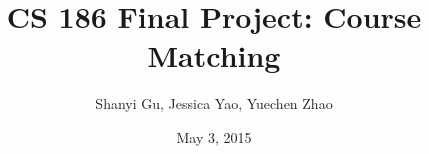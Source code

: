 \documentclass{article}
\begin{document}
\title{CS 186 Final Project: Course Matching}
\author{Shanyi Gu, Jessica Yao, Yuechen Zhao}
\date{May 3, 2015}

\maketitle
\end{document}
